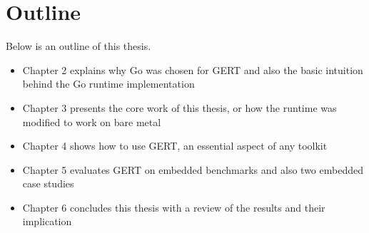 \section{Outline}
Below is an outline of this thesis.
\begin{itemize}
  \item Chapter 2 explains why Go was chosen for GERT and also the basic intuition behind the Go runtime implementation
  \item Chapter 3 presents the core work of this thesis, or how the runtime was modified to work on bare metal
  \item Chapter 4 shows how to use GERT, an essential aspect of any toolkit
  \item Chapter 5 evaluates GERT on embedded benchmarks and also two embedded case studies
  \item Chapter 6 concludes this thesis with a review of the results and their implication
\end{itemize}
